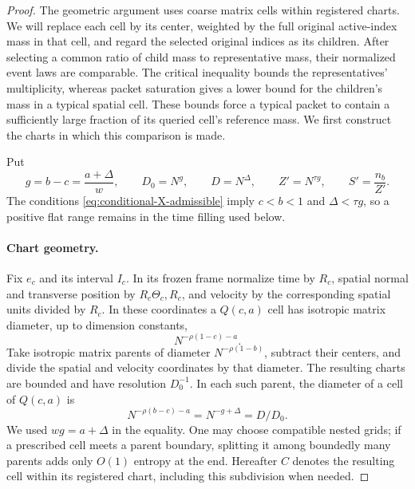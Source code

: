\begin{proof}
The geometric argument uses coarse matrix cells within registered
charts. We will replace each cell by its center, weighted by the full
original active-index mass in that cell, and regard the selected
original indices as its children. After selecting a common ratio of child mass
to representative mass, their normalized event laws are comparable.
The critical inequality bounds the representatives' multiplicity,
whereas packet saturation gives a lower bound for the children's mass
in a typical spatial cell. These bounds force a typical packet to
contain a sufficiently large fraction of its queried cell's reference
mass. We first construct the charts in which this comparison is made.

Put
\begin{equation}
 g=b-c=\frac{a+\Delta}{w},\qquad
 D_0=N^g,\qquad D=N^\Delta,\qquad
 Z'=N^{\tau g},\qquad S'=\frac{n_b}{Z'}.
\label{eq:X-test-parameters}
\end{equation}
The conditions \eqref{eq:conditional-X-admissible} imply
$c<b<1$ and $\Delta<\tau g$, so a positive flat range remains in
the time filling used below.

\paragraph{Chart geometry.}
Fix $e_c$ and its interval $I_c$. In its frozen frame normalize time
by $R_c$, spatial normal and transverse position by
$R_c\Theta_c,R_c$, and velocity by the corresponding spatial units
divided by $R_c$. In these coordinates a $Q(c,a)$ cell has isotropic
matrix diameter, up to dimension constants,
\[
 N^{-\rho(1-c)-a}.
\]
Take isotropic matrix parents of diameter $N^{-\rho(1-b)}$, subtract
their centers, and divide the spatial and velocity coordinates by
that diameter. The resulting charts are bounded and have resolution
$D_0^{-1}$. In each such parent, the diameter of a cell of
$Q(c,a)$ is
\begin{equation}
 N^{-\rho(b-c)-a}=N^{-g+\Delta}=D/D_0.
\label{eq:X-cell-diameter}
\end{equation}
We used $wg=a+\Delta$ in the equality. One may choose compatible
nested grids; if a prescribed cell meets a parent boundary, splitting
it among boundedly many parents adds only $O(1)$ entropy at the end.
Hereafter $C$ denotes the resulting cell within its registered chart,
including this subdivision when needed.


\end{proof}
